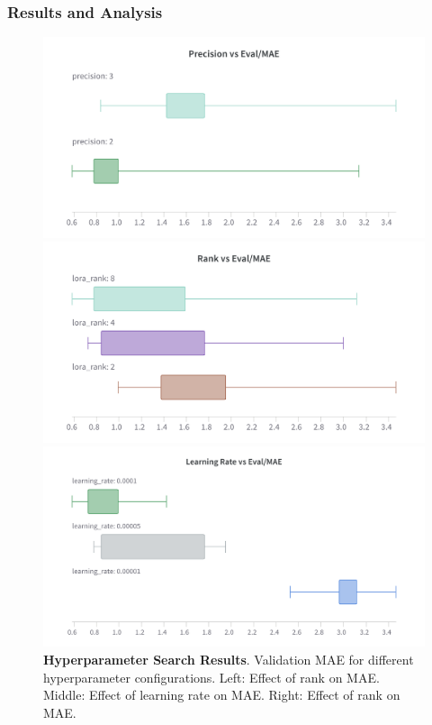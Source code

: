 \documentclass{article}
\begin{document}
\subsubsection*{Results and Analysis}
\begin{figure}[h]
    \centering
    \begin{minipage}{0.48\textwidth}
        \centering
        \includegraphics[width=\textwidth]{precision}
    \end{minipage}
    \hfill
    \begin{minipage}{0.48\textwidth}
        \centering
        \includegraphics[width=\textwidth]{rank}
    \end{minipage}
    \begin{minipage}{0.48\textwidth}
        \centering
        \includegraphics[width=\textwidth]{learningrate}
    \end{minipage}
   \caption{\textbf{Hyperparameter Search Results}. Validation MAE for different hyperparameter configurations. Left: Effect of rank on MAE. Middle: Effect of learning rate on MAE. Right: Effect of rank on MAE.}
    \label{fig:hyperparameter_search}
\end{figure}
\end{document}

